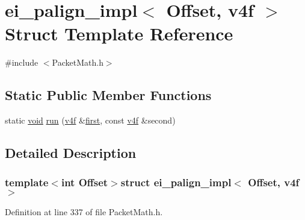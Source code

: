 \hypertarget{structei__palign__impl_3_01_offset_00_01v4f_01_4}{\section{ei\-\_\-palign\-\_\-impl$<$ Offset, v4f $>$ Struct Template Reference}
\label{structei__palign__impl_3_01_offset_00_01v4f_01_4}
}


{\ttfamily \#include $<$Packet\-Math.\-h$>$}

\subsection*{Static Public Member Functions}
\begin{DoxyCompactItemize}
\item 
static \hyperlink{group___u_a_v_objects_plugin_ga444cf2ff3f0ecbe028adce838d373f5c}{void} \hyperlink{structei__palign__impl_3_01_offset_00_01v4f_01_4_a0497552f343c64759a9a0d5470285a84}{run} (\hyperlink{_alti_vec_2_packet_math_8h_a797e34bb4901532e01ef24c9f9458bf2}{v4f} \&\hyperlink{glext_8h_a970a385f6f880f2b620451db4ca4299a}{first}, const \hyperlink{_alti_vec_2_packet_math_8h_a797e34bb4901532e01ef24c9f9458bf2}{v4f} \&second)
\end{DoxyCompactItemize}


\subsection{Detailed Description}
\subsubsection*{template$<$int Offset$>$struct ei\-\_\-palign\-\_\-impl$<$ Offset, v4f $>$}



Definition at line 337 of file Packet\-Math.\-h.



